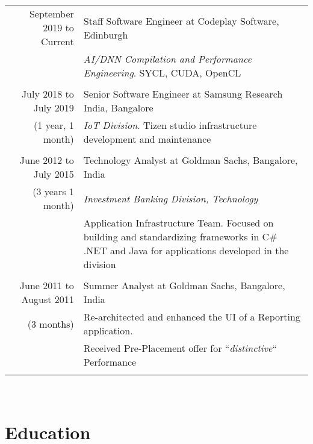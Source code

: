 \documentclass[a4paper,10pt]{article} %
\begin{document}
\begin{tabular}{r|p{12cm}}
September 2019 to Current & Staff Software Engineer at Codeplay Software, Edinburgh\\
& \emph{AI/DNN Compilation and Performance Engineering}. \small {SYCL, CUDA, OpenCL } \\
& \\

July 2018 to July 2019 & Senior Software Engineer at Samsung Research India, Bangalore \\
{(1 year, 1 month)}& \emph{IoT Division}. \small {Tizen studio infrastructure 
development and maintenance}\\
& \\

June 2012 to July 2015 & Technology Analyst at Goldman Sachs, Bangalore, India \\
{(3 years 1 month)}& \emph{Investment Banking Division, Technology}\\ 
& \small {Application Infrastructure Team. Focused on building and standardizing frameworks in C\# .NET and Java for
applications developed in the division}\\
& \\

June 2011 to August 2011 & Summer Analyst at Goldman Sachs, Bangalore, India \\
{(3 months)}& \small{Re-architected and enhanced the UI of a Reporting application.}\\
& \small{ Received Pre-Placement offer for ``\emph{distinctive}`` Performance }\\
& \\

\end{tabular}
\\

\section{Education}
\end{document}
